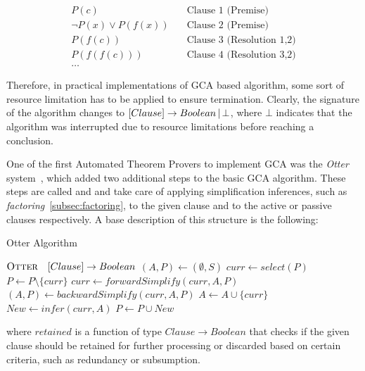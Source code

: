 \begin{equation}
   \begin{aligned}
    P(c) &\quad \text{Clause 1 (Premise)} \\
    \neg P(x) \lor P(f(x)) &\quad \text{Clause 2 (Premise)} \\
    P(f(c)) &\quad \text{Clause 3 (Resolution 1,2)} \\
    P(f(f(c))) &\quad \text{Clause 4 (Resolution 3,2)} \\
    \ldots
  \end{aligned}
\end{equation}

Therefore, in practical implementations of GCA based algorithm, some sort of resource limitation has to be applied to ensure termination.
Clearly, the signature of the algorithm changes to \([Clause] \to Boolean \,|\, \bot\), where \(\bot\) indicates that the algorithm was interrupted due to resource limitations before reaching a conclusion.

One of the first Automated Theorem Provers to implement GCA was the \emph{Otter} system~\cite{mccune1994otter},  which added two additional steps to the basic GCA algorithm.
These steps are called  and  and take care of applying simplification inferences, such as \emph{factoring}~\ref{subsec:factoring}, to the given clause and to the active or passive clauses respectively.
A base description of this structure is the following:
\begin{algorithm}[H]
    \caption{Otter Algorithm}\label{alg:otter-algorithm}
    \begin{algorithmic}[1]
        \Statex{}  \(\textsc{Otter} \quad [Clause] \to Boolean\)
            \State{} \((A,P)\gets (\emptyset,S)\)
                \State{} \(curr \gets select(P)\)
                \State{} \(P \gets P \setminus \{curr\}\)
                    \State{} \(curr \gets forwardSimplify(curr,A,P)\)
                        \State{} 
                    \EndIf{}
                        \State{} \((A,P) \gets backwardSimplify(curr,A,P)\)
                        \State{} \(A \gets A \cup \{curr\}\)
                        \State{} \(New \gets infer(curr, A)\)
                            \State{} 
                        \EndIf{}
                        \State{} \(P \gets P \cup New\)
                    \EndIf{}
                \EndIf{}
            \EndWhile{}
            \State{} 
        \EndFunction{}
    \end{algorithmic}
\end{algorithm}
where \(retained\) is a function of type \(Clause \to Boolean\) that checks if the given clause should be retained for further processing or discarded based on certain criteria, such as redundancy or subsumption.

